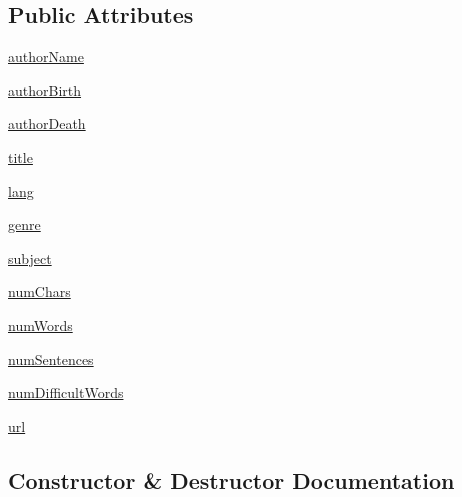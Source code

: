 \subsection*{Public Attributes}
\begin{DoxyCompactItemize}
\item 
\hyperlink{class_bridges_1_1data__src__dependent_1_1_gutenberg_book_1_1_gutenberg_book_a6be81603dd5a4894946ecdf876836f87}{author\+Name}
\item 
\hyperlink{class_bridges_1_1data__src__dependent_1_1_gutenberg_book_1_1_gutenberg_book_a80097f424d1a9dd5c5c0b71e85b23132}{author\+Birth}
\item 
\hyperlink{class_bridges_1_1data__src__dependent_1_1_gutenberg_book_1_1_gutenberg_book_a08ff3d5f18a0fc670e61372ff0eee9d7}{author\+Death}
\item 
\hyperlink{class_bridges_1_1data__src__dependent_1_1_gutenberg_book_1_1_gutenberg_book_afa38d09f6201d7795b9b2e06a5ce8779}{title}
\item 
\hyperlink{class_bridges_1_1data__src__dependent_1_1_gutenberg_book_1_1_gutenberg_book_a7503e10595e32bad7d1189c869ddc323}{lang}
\item 
\hyperlink{class_bridges_1_1data__src__dependent_1_1_gutenberg_book_1_1_gutenberg_book_ab4a47ece9f1bd4b82adec1ebf6e8fa2d}{genre}
\item 
\hyperlink{class_bridges_1_1data__src__dependent_1_1_gutenberg_book_1_1_gutenberg_book_ad73cb81acfa22ae06d7e9814476a7d72}{subject}
\item 
\hyperlink{class_bridges_1_1data__src__dependent_1_1_gutenberg_book_1_1_gutenberg_book_ab8cd6d3bec785f191469b30377f69795}{num\+Chars}
\item 
\hyperlink{class_bridges_1_1data__src__dependent_1_1_gutenberg_book_1_1_gutenberg_book_a855206c4dfd1f49a76b16273dd2f5594}{num\+Words}
\item 
\hyperlink{class_bridges_1_1data__src__dependent_1_1_gutenberg_book_1_1_gutenberg_book_ae9c14955eb7ac64467c776ebcb75e3b5}{num\+Sentences}
\item 
\hyperlink{class_bridges_1_1data__src__dependent_1_1_gutenberg_book_1_1_gutenberg_book_a4b442ee1b36e78bc428961fc886636a4}{num\+Difficult\+Words}
\item 
\hyperlink{class_bridges_1_1data__src__dependent_1_1_gutenberg_book_1_1_gutenberg_book_a615f07b0938c879140df8ca40d0a4aeb}{url}
\end{DoxyCompactItemize}


\subsection{Constructor \& Destructor Documentation}
\hypertarget{class_bridges_1_1data__src__dependent_1_1_gutenberg_book_1_1_gutenberg_book_ac8346f638901d9adf9c03c24eba1ab99}{}
